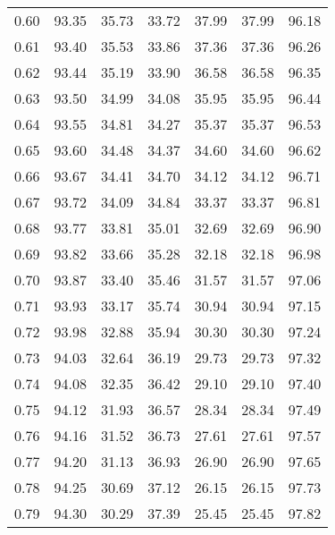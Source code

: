 \begin{tabular}{|c|c|c|c|c|c|c|}
      0.60 &     93.35 &     35.73 &      33.72 &   37.99 &      37.99 &         96.18 \\
      0.61 &     93.40 &     35.53 &      33.86 &   37.36 &      37.36 &         96.26 \\
      0.62 &     93.44 &     35.19 &      33.90 &   36.58 &      36.58 &         96.35 \\
      0.63 &     93.50 &     34.99 &      34.08 &   35.95 &      35.95 &         96.44 \\
      0.64 &     93.55 &     34.81 &      34.27 &   35.37 &      35.37 &         96.53 \\
      0.65 &     93.60 &     34.48 &      34.37 &   34.60 &      34.60 &         96.62 \\
      0.66 &     93.67 &     34.41 &      34.70 &   34.12 &      34.12 &         96.71 \\
      0.67 &     93.72 &     34.09 &      34.84 &   33.37 &      33.37 &         96.81 \\
      0.68 &     93.77 &     33.81 &      35.01 &   32.69 &      32.69 &         96.90 \\
      0.69 &     93.82 &     33.66 &      35.28 &   32.18 &      32.18 &         96.98 \\
      0.70 &     93.87 &     33.40 &      35.46 &   31.57 &      31.57 &         97.06 \\
      0.71 &     93.93 &     33.17 &      35.74 &   30.94 &      30.94 &         97.15 \\
      0.72 &     93.98 &     32.88 &      35.94 &   30.30 &      30.30 &         97.24 \\
      0.73 &     94.03 &     32.64 &      36.19 &   29.73 &      29.73 &         97.32 \\
      0.74 &     94.08 &     32.35 &      36.42 &   29.10 &      29.10 &         97.40 \\
      0.75 &     94.12 &     31.93 &      36.57 &   28.34 &      28.34 &         97.49 \\
      0.76 &     94.16 &     31.52 &      36.73 &   27.61 &      27.61 &         97.57 \\
      0.77 &     94.20 &     31.13 &      36.93 &   26.90 &      26.90 &         97.65 \\
      0.78 &     94.25 &     30.69 &      37.12 &   26.15 &      26.15 &         97.73 \\
      0.79 &     94.30 &     30.29 &      37.39 &   25.45 &      25.45 &         97.82 \\

\end{tabular}
